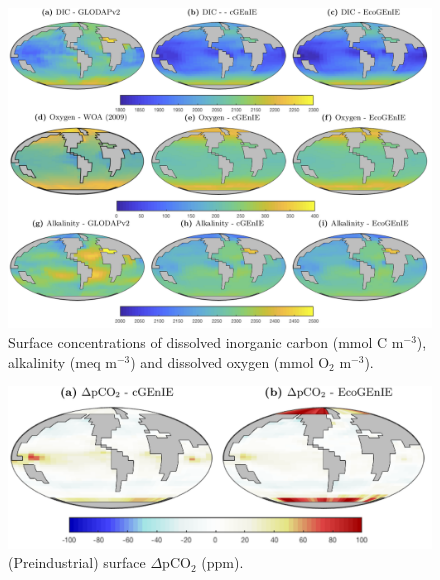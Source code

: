\documentclass[gmd, manuscript]{copernicus}
\begin{document}
{\begin{figure}[htp]
\includegraphics[width=0.95\linewidth]{Final_figures/Fig_3.png}
\caption{Surface concentrations of dissolved inorganic carbon (mmol C m$^{-3}$), alkalinity (meq m$^{-3}$) and dissolved oxygen (mmol O$_2$ m$^{-3}$).}
\label{fig:carbon}
\end{figure}


\begin{figure}[htp]
\includegraphics[width=0.75\linewidth]{Final_figures/Fig_4.png}
\caption{(Preindustrial) surface $\Delta$pCO$_2$ (ppm).}
\label{fig:dpCO2}
\end{figure}




}
\end{document}
